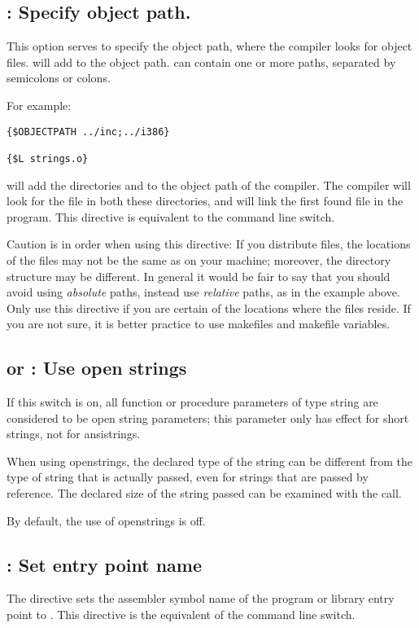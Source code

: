 \subsection{ : Specify object path.}

This option serves to specify the object path, where the compiler looks for
object files.  will add  to the object
path.  can contain one or more paths, separated by semicolons or
colons.

For example:
\begin{verbatim}
{$OBJECTPATH ../inc;../i386}

{$L strings.o}
\end{verbatim}

will add the directories  and  to the
object path of the compiler. The compiler will look for the file 
in both these directories, and will link the first found file in the
program. This directive is equivalent to the  command line switch.

Caution is in order when using this directive: If you distribute files, the
locations of the files may not be the same as on your machine; moreover, the
directory structure may be different. In general it would be fair to say
that you should avoid using {\em absolute} paths, instead use {\em relative}
paths, as in the example above. Only use this directive if you are certain
of the locations where the files reside. If you are not sure, it is better
practice to use makefiles and makefile variables.

\subsection{ or  : Use open strings}

If this switch is on, all function or procedure parameters of type string
are considered to be open string parameters; this parameter only has effect
for short strings, not for ansistrings.

When using openstrings, the declared type of the string can be different
from the type of string that is actually passed, even for strings that are
passed by reference. The declared size of the string passed can be examined
with the  call.

By default, the use of openstrings is off.

\subsection{ : Set entry point name}
\label{se:Pascalmainname}
The  directive sets the assembler
symbol name of the program or library entry point to .
This directive is the equivalent of the  command line switch.

